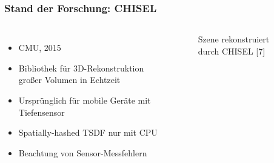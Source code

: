 \begin{frame}[t]
  \frametitle{Stand der Forschung: CHISEL}
  
  \begin{columns}[t]
      \column[]{6cm}
      
      \begin{itemize}
      \item CMU, 2015
      \item Bibliothek für 3D-Rekonstruktion großer Volumen in Echtzeit
      \item Ursprünglich für mobile Geräte mit Tiefensensor
      \item Spatially-hashed TSDF nur mit CPU

      \item Beachtung von Sensor-Messfehlern
     \end{itemize}
     
     \column{6cm}
      
      \begin{figure}[h]
 	\caption{Szene rekonstruiert durch CHISEL [7]} 
      \end{figure}
  
    \end{columns}
\end{frame}

